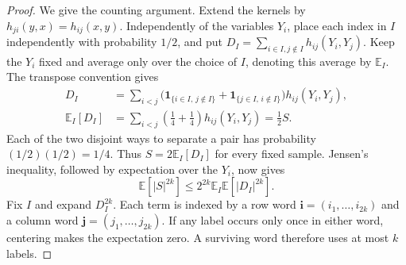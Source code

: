 \documentclass[11pt,reqno]{amsart}
\numberwithin{equation}{section}
\theoremstyle{plain}
\theoremstyle{definition}
\newcommand{\E}{\mathbb E}
\newcommand{\one}{\mathbf 1}
\begin{document}
\begin{proof}
We give the counting argument.  Extend the kernels by $h_{ji}(y,x)=h_{ij}(x,y)$.  Independently of the variables $Y_i$, place each index in $I$ independently with probability $1/2$, and put
$D_I=\sum_{i\in I,j\notin I}h_{ij}(Y_i,Y_j)$.
Keep the $Y_i$ fixed and average only over the choice of $I$, denoting this average by $\E_I$.  The transpose convention gives
\begin{equation}
 \begin{aligned}
 D_I&=\sum_{i<j}
 \big(\one_{\{i\in I,\,j\notin I\}}+\one_{\{j\in I,\,i\notin I\}}\big)
 h_{ij}(Y_i,Y_j),\\
 \E_I[D_I]&=\sum_{i<j}\left(\frac14+\frac14\right)h_{ij}(Y_i,Y_j)
 =\frac12 S.
 \end{aligned}
 \label{eq:array-split-identity}
\end{equation}
Each of the two disjoint ways to separate a pair has probability $(1/2)(1/2)=1/4$.  Thus $S=2\E_I[D_I]$ for every fixed sample.  Jensen's inequality, followed by expectation over the $Y_i$, now gives
\begin{equation}
 \E[|S|^{2k}]\le2^{2k}\E_I\E[|D_I|^{2k}].
 \label{eq:array-random-split}
\end{equation}
Fix $I$ and expand $D_I^{2k}$.  Each term is indexed by a row word
$\mathbf i=(i_1,\ldots,i_{2k})$ and a column word
$\mathbf j=(j_1,\ldots,j_{2k})$.
If any label occurs only once in either word, centering makes the expectation zero.  A surviving word therefore uses at most $k$ labels.


\end{proof}
\end{document}
